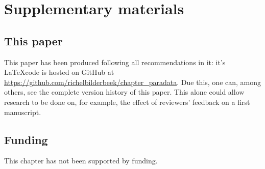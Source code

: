 \newpage
\appendix
\section{Supplementary materials}

\renewcommand{\thefigure}{S\arabic{figure}}
\setcounter{figure}{0}

\renewcommand{\thetable}{S\arabic{table}}
\setcounter{table}{0}

\subsection{This paper}

This paper has been produced following all recommendations in it:
it's \LaTeX code is hosted on GitHub 
at \url{https://github.com/richelbilderbeek/chapter_paradata}.
Due this, one can, among others, see the complete version history of this paper.
This alone could allow research to be done on, for example,
the effect of reviewers' feedback on a first manuscript.

\subsection{Funding}

This chapter has not been supported by funding.

% 
% 
%
%
%


